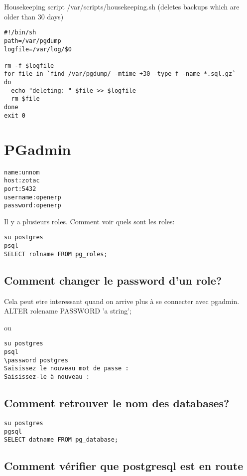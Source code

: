 \documentclass[12pt,a4paper]{article}
\begin{document}
Housekeeping script /var/scripts/housekeeping.sh (deletes backups which are older than 30 days)

\begin{verbatim}
#!/bin/sh
path=/var/pgdump
logfile=/var/log/$0

rm -f $logfile
for file in `find /var/pgdump/ -mtime +30 -type f -name *.sql.gz`
do
  echo "deleting: " $file >> $logfile
  rm $file
done
exit 0
\end{verbatim}

\section{PGadmin}
\label{sec:pgadmin_remote}


\begin{alltt}
name:unnom
host:zotac
port: 5432
username: openerp
password: openerp
\end{alltt}

Il y a plusieurs roles.
Comment voir quels sont les roles:
\begin{verbatim}
su postgres
psql
SELECT rolname FROM pg_roles;
\end{verbatim}


\subsection{Comment changer le password d'un role?}
\label{sec:chpass}

Cela peut etre interessant quand on arrive plus à se connecter avec pgadmin.
ALTER rolename PASSWORD 'a string';

ou 
\begin{verbatim}
su postgres
psql
\password postgres
Saisissez le nouveau mot de passe :
Saisissez-le à nouveau :
\end{verbatim}

\subsection{Comment retrouver le nom des databases?}
\label{sec:databas_name}

\begin{verbatim}
su postgres
pgsql 
SELECT datname FROM pg_database;
\end{verbatim}

\subsection{Comment vérifier que postgresql est en route}
\label{sec:postgresql}
\end{document}
